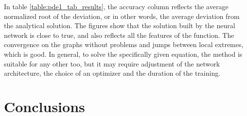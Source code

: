 In table \ref{table:pde1_tab_results}, the accuracy column reflects the average normalized root of the deviation, or in other words, the average deviation from the analytical solution. The figures show that the solution built by the neural network is close to true, and also reflects all the features of the function. The convergence on the graphs without problems and jumps between local extremes, which is good. In general, to solve the specifically given equation, the method is suitable for any other too, but it may require adjustment of the network architecture, the choice of an optimizer and the duration of the training.

\section{Conclusions}

